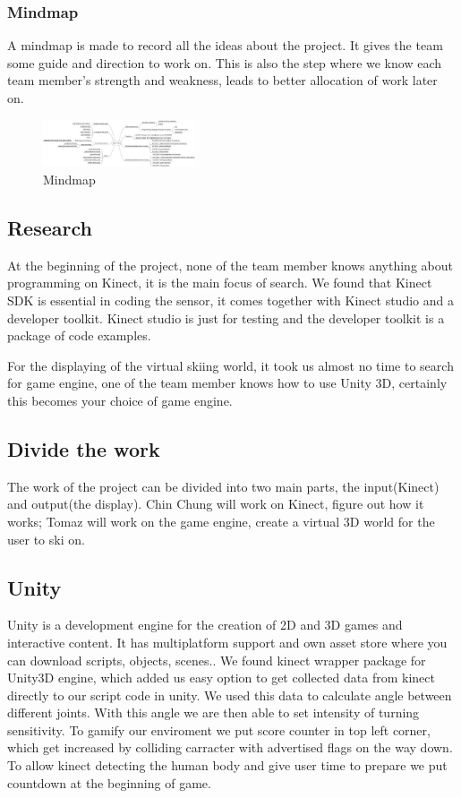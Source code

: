 \documentclass[fonts]{icst}
\begin{document}
\subsubsection{Mindmap}
A mindmap is made to record all the ideas about the project. It gives the team some guide and direction to work on. This is also the step where we know each team member's strength and weakness, leads to better allocation of work later on. 

\begin{figure}
    \centering
    \includegraphics[width=0.4\textwidth]{mindmap.png}
    \caption{Mindmap}
    \label{fig:awesome_image}
\end{figure}

\subsection{Research}
At the beginning of the project, none of the team member knows anything about programming on Kinect, it is the main focus of search. We found that Kinect SDK is essential in coding the sensor, it comes together with Kinect studio and a developer toolkit. Kinect studio is just for testing and the developer toolkit is a package of code examples.

For the displaying of the virtual skiing world, it took us almost no time to search for game engine, one of the team member knows how to use Unity 3D, certainly this becomes your choice of game engine. 

\subsection{Divide the work}
The work of the project can be divided into two main parts, the input(Kinect) and output(the display). Chin Chung will work on Kinect, figure out how it works; Tomaz will work on the game engine, create a virtual 3D world for the user to ski on. 

\subsection{Unity}
Unity is a development engine for the creation of 2D and 3D games and interactive content. It has multiplatform support and own asset store where you can download scripts, objects, scenes.. \cite{UNITY}
We found kinect wrapper package\cite{MERGE} for Unity3D engine, which added us easy option to get collected data from kinect directly to our script code in unity. We used this data to calculate angle between different joints. With this angle we are then able to set intensity of turning sensitivity. To gamify our enviroment we put score counter in top left corner, which get increased by colliding carracter with advertised flags on the way down. To allow kinect detecting the human body and give user time to prepare we put countdown at the beginning of game.
\end{document}
